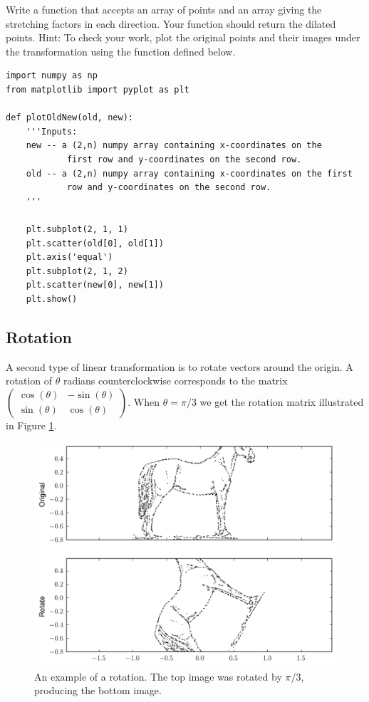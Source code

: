 \begin{problem}\label{prob:dilation}
Write a function that accepts an array of points and an array giving the stretching factors in each direction. Your function should return the dilated points. Hint: To check your work, plot the original points and their images under the transformation using the function  defined below.
\begin{lstlisting}
import numpy as np
from matplotlib import pyplot as plt

def plotOldNew(old, new):
    '''Inputs:
    new -- a (2,n) numpy array containing x-coordinates on the 
            first row and y-coordinates on the second row.
    old -- a (2,n) numpy array containing x-coordinates on the first
            row and y-coordinates on the second row.
    '''
            
    plt.subplot(2, 1, 1)
    plt.scatter(old[0], old[1])
    plt.axis('equal')
    plt.subplot(2, 1, 2)
    plt.scatter(new[0], new[1])
    plt.show()
\end{lstlisting}
\end{problem}

\subsection*{Rotation}
A second type of linear transformation is to rotate vectors around the origin. A rotation of $\theta$ radians counterclockwise corresponds to the matrix $\begin{pmatrix}
\cos(\theta) & -\sin(\theta) \\
\sin(\theta) & \cos(\theta)
\end{pmatrix}.$ When $\theta = \pi/3$ we get the rotation matrix illustrated in Figure \ref{fig:rotate}.

\begin{figure}
\includegraphics[width=\textwidth]{rotate.pdf}
\caption{An example of a rotation.
The top image was rotated by $\pi/3$, producing the bottom image.}
\label{fig:rotate}
\end{figure}


